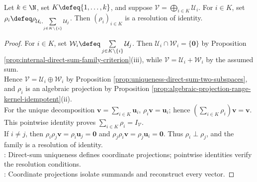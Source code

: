 \begin{theorem} \label{thm:direct-sum-gives-resolution-of-identity} \\
Let $k\in\N$, set $K\defeq\{1,\ldots,k\}$, and suppose $\mathcal{V}=\bigoplus\limits_{i\in K}\mathcal{U}_i$. For $i\in K$, set $\rho_i\defeq\rho_{\mathcal{U}_i,\sum\limits_{j\in K\setminus\{i\}}\mathcal{U}_j}$. Then $(\rho_i)_{i\in K}$ is a resolution of identity.
\begin{proof}
For $i\in K$, set $\mathcal{W}_i\defeq\sum\limits_{j\in K\setminus\{i\}}\mathcal{U}_j$. Then $\mathcal{U}_i\cap\mathcal{W}_i=\{\mathbf{0}\}$ by Proposition \ref{prop:internal-direct-sum-family-criterion}(iii), while $\mathcal{V}=\mathcal{U}_i+\mathcal{W}_i$ by the assumed sum.\\
Hence $\mathcal{V}=\mathcal{U}_i\oplus\mathcal{W}_i$ by Proposition \ref{prop:uniqueness-direct-sum-two-subspaces}, and $\rho_i$ is an algebraic projection by Proposition \ref{prop:algebraic-projection-range-kernel-idempotent}(ii).\\
For the unique decomposition $\mathbf{v}=\sum\limits_{i\in K}\mathbf{u}_i$, $\rho_i\mathbf{v}=\mathbf{u}_i$; hence $(\sum\limits_{i\in K}\rho_i)\mathbf{v}=\mathbf{v}$. This pointwise identity proves $\sum\limits_{i\in K}\rho_i=I_{\mathcal{V}}$.\\
If $i\neq j$, then $\rho_i\rho_j\mathbf{v}=\rho_i\mathbf{u}_j=\mathbf{0}$ and $\rho_j\rho_i\mathbf{v}=\rho_j\mathbf{u}_i=\mathbf{0}$. Thus $\rho_i\perp\rho_j$, and the family is a resolution of identity.\\
: Direct-sum uniqueness defines coordinate projections; pointwise identities verify the resolution conditions.\\
: Coordinate projections isolate summands and reconstruct every vector.
\end{proof}
\end{theorem}

